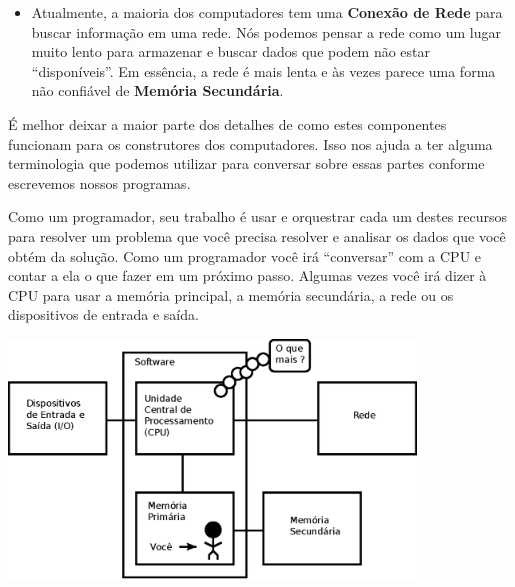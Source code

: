 \begin{itemize}
\item Atualmente, a maioria dos computadores tem uma
{\bf Conexão de Rede} para buscar informação em uma rede.
Nós podemos pensar a rede como um lugar muito lento para armazenar
e buscar dados que podem não estar ``disponíveis''. Em essência,
a rede é mais lenta e às vezes parece uma forma não confiável de
{\bf Memória Secundária}.
%

\end{itemize}
%

É melhor deixar a maior parte dos detalhes de como estes componentes funcionam para
os construtores dos computadores. Isso nos ajuda a ter alguma terminologia
que podemos utilizar para conversar sobre essas partes conforme escrevemos nossos programas.
%

Como um programador, seu trabalho é usar e orquestrar
cada um destes recursos para resolver um problema que você precisa resolver
e analisar os dados que você obtém da solução. Como um programador você irá
``conversar'' com a CPU e contar a ela o que fazer em um próximo passo.
Algumas vezes você irá dizer à CPU para usar a memória principal, a memória
secundária, a rede ou os dispositivos de entrada e saída.
%

\beforefig
\centerline{\includegraphics[height=2.50in]{figs2/arch2.eps}}
\afterfig
%

